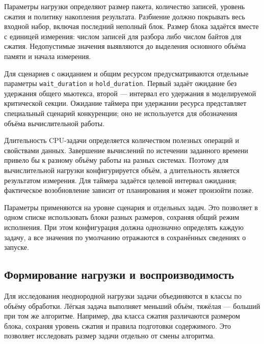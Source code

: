 Параметры нагрузки определяют размер пакета, количество записей, уровень сжатия и политику
  накопления результата. Разбиение должно покрывать весь входной набор, включая последний
  неполный блок. Размер блока задаётся вместе с единицей измерения: числом записей для разбора
  либо числом байтов для сжатия. Недопустимые значения выявляются до выделения основного объёма
  памяти и начала измерения.

Для сценариев с ожиданием и общим ресурсом предусматриваются отдельные параметры
  \texttt{wait\_duration} и \texttt{hold\_duration}. Первый задаёт ожидание без удержания
  общего мьютекса, второй — интервал его удержания в моделируемой критической секции.
  Ожидание таймера при удержании ресурса представляет специальный сценарий конкуренции;
  оно не используется для обозначения объёма вычислительной работы.

Длительность CPU-задачи определяется количеством полезных операций и свойствами данных.
  Завершение вычислений по истечении заданного времени привело бы к разному объёму работы
  на разных системах. Поэтому для вычислительной нагрузки конфигурируется объём, а длительность
  является результатом измерения. Для таймера задаётся целевой интервал ожидания; фактическое
  возобновление зависит от планирования и может произойти позже.

Параметры применяются на уровне сценария и отдельных задач. Это позволяет в одном списке
  использовать блоки разных размеров, сохраняя общий режим исполнения. При этом конфигурация
  должна однозначно определять каждую задачу, а все значения по умолчанию отражаются в сохранённых
  сведениях о запуске.


\subsection{Формирование нагрузки и воспроизводимость}
\label{subsec:reproducible-workloads}

Для исследования неоднородной нагрузки задачи объединяются в классы по объёму обработки.
  Лёгкая задача выполняет меньший объём, тяжёлая — больший при том же алгоритме. Например,
  два класса сжатия различаются размером блока, сохраняя уровень сжатия и правила подготовки
  содержимого. Это позволяет исследовать размер задачи отдельно от смены алгоритма.

